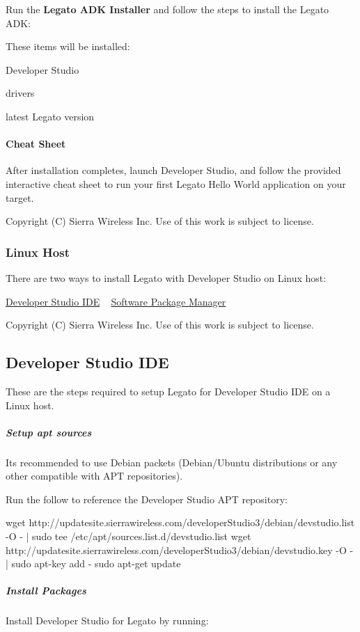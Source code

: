 Run the {\bfseries Legato A\+D\+K Installer} and follow the steps to install the Legato A\+D\+K\+:

These items will be installed\+:
\begin{DoxyItemize}
\item Developer Studio
\item drivers
\item latest Legato version
\end{DoxyItemize}\hypertarget{getstarted_d_swindows_getstartedDSwindows_cheatSheet}{}\paragraph{Cheat Sheet}\label{getstarted_d_swindows_getstartedDSwindows_cheatSheet}
After installation completes, launch Developer Studio, and follow the provided interactive cheat sheet to run your first Legato Hello World application on your target.





Copyright (C) Sierra Wireless Inc. Use of this work is subject to license. \hypertarget{getstartedDSlinux}{}\subsubsection{Linux Host}\label{getstartedDSlinux}
There are two ways to install Legato with Developer Studio on Linux host\+:

\hyperlink{getstartedDSlinuxIDE}{Developer Studio I\+D\+E} ~\newline
 \hyperlink{getstartedDSspm}{Software Package Manager}





Copyright (C) Sierra Wireless Inc. Use of this work is subject to license. \hypertarget{getstartedDSlinuxIDE}{}\subsection{Developer Studio I\+D\+E}\label{getstartedDSlinuxIDE}
These are the steps required to setup Legato for Developer Studio I\+D\+E on a Linux host.\hypertarget{getstarted_d_slinux_i_d_e_getstartedDSlinuxIDE_debian}{}\subparagraph{Setup apt sources}\label{getstarted_d_slinux_i_d_e_getstartedDSlinuxIDE_debian}
It\textquotesingle{}s recommended to use Debian packets (Debian/\+Ubuntu distributions or any other compatible with A\+P\+T repositories).

Run the follow to reference the Developer Studio A\+P\+T repository\+: 
\begin{DoxyCode}
wget http:\textcolor{comment}{//updatesite.sierrawireless.com/developerStudio3/debian/devstudio.list -O - | sudo tee
       /etc/apt/sources.list.d/devstudio.list}
wget http:\textcolor{comment}{//updatesite.sierrawireless.com/developerStudio3/debian/devstudio.key -O - | sudo apt-key add -}
sudo apt-\textcolor{keyword}{get} update
\end{DoxyCode}
\hypertarget{getstarted_d_slinux_i_d_e_getstartedDSlinuxIDE_packets}{}\subparagraph{Install Packages}\label{getstarted_d_slinux_i_d_e_getstartedDSlinuxIDE_packets}
Install Developer Studio for Legato by running\+:

